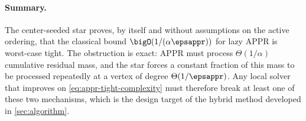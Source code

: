 \paragraph{Summary.}
The center-seeded star proves, by itself and without assumptions on the active
ordering, that the classical bound \(\bigO(1/(\alpha\epsappr))\) for lazy APPR
is worst-case tight. The obstruction is exact: APPR must process
\(\Theta(1/\alpha)\) cumulative residual mass, and the star forces a constant
fraction of this mass to be processed repeatedly at a vertex of degree
\(\Theta(1/\epsappr)\). Any local solver that improves on
\cref{eq:appr-tight-complexity} must therefore break at least one of these two
mechanisms, which is the design target of the hybrid method developed in
\cref{sec:algorithm}.

